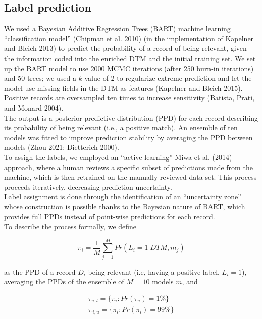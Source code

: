 \documentclass{article}
\begin{document}
\hypertarget{label-prediction}{%
\subsection{Label prediction}\label{label-prediction}}

We used a Bayesian Additive Regression Trees (BART) machine learning
``classification model'' (Chipman et al. 2010) (in the implementation of
Kapelner and Bleich 2013) to predict the probability of a record of
being relevant, given the information coded into the enriched DTM and
the initial training set. We set up the BART model to use 2000 MCMC
iterations (after 250 burn-in iterations) and 50 trees; we used a \(k\)
value of 2 to regularize extreme prediction and let the model use
missing fields in the DTM as features (Kapelner and Bleich 2015).
Positive records are oversampled ten times to increase sensitivity
(Batista, Prati, and Monard 2004).\\
The output is a posterior predictive distribution (PPD) for each record
describing its probability of being relevant (i.e., a positive match).
An ensemble of ten models was fitted to improve prediction stability by
averaging the PPD between models (Zhou 2021; Dietterich 2000).\\

To assign the labels, we employed an ``active learning'' Miwa et al.
(2014) approach, where a human reviews a specific subset of predictions
made from the machine, which is then retrained on the manually reviewed
data set. This process proceeds iteratively, decreasing prediction
uncertainty.\\
Label assignment is done through the identification of an ``uncertainty
zone'' whose construction is possible thanks to the Bayesian nature of
BART, which provides full PPDs instead of point-wise predictions for
each record.\\
To describe the process formally, we define

\[\pi_i = \frac{1}{M}\sum_{j=1}^M Pr(L_i = \text{1}|DTM,m_j)\]

as the PPD of a record \(D_i\) being relevant (i.e, having a positive
label, \(L_i = 1\)), averaging the PPDs of the ensemble of \(M=10\)
models \(m\), and

\[
\begin{aligned}
\pi_{i,l} = \{\pi_i : Pr(\pi_i) = 1\%\}\\
\pi_{i,u} = \{\pi_i : Pr(\pi_i) = 99\%\}
\end{aligned}
\]
\end{document}

